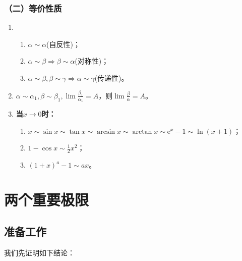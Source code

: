     \subsubsection*{（二）等价性质}
    \begin{enumerate}
        \item \begin{enumerate}
            \item $ \alpha \sim \alpha $(自反性)；
            \item $ \alpha \sim \beta \Rightarrow \beta \sim \alpha $(对称性)；
            \item $ \alpha \sim \beta , \beta \sim \gamma \Rightarrow \alpha \sim \gamma $(传递性)。
        \end{enumerate}
        \item $ \alpha \sim \alpha_1, \beta \sim \beta_1, \lim \displaystyle\frac{\beta_1}{\alpha_1} =A$，则$\lim \displaystyle\frac{\beta}{\alpha} =A$。
        \item \textbf{当$x \to 0$时：} \begin{enumerate}
            \item $x \sim \sin x \sim \tan x \sim \arcsin x \sim \arctan x \sim \mathrm{e}^x -1 \sim \ln{(x+1)}$；
            \item $1- \cos x \sim \displaystyle\frac{1}{2} x^2$；
            \item $(1+x)^a-1 \sim ax$。
        \end{enumerate}
    \end{enumerate}
    
    \section{两个重要极限}
    \subsection{准备工作}
    我们先证明如下结论：

